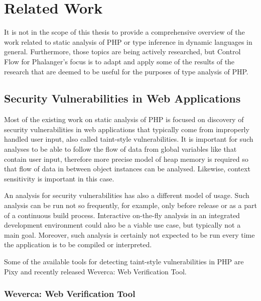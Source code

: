 \chapter{Related Work}

    It is not in the scope of this thesis to provide a comprehensive 
    overview of the work related to static analysis of PHP or type 
    inference in dynamic languages in general. Furthermore, those 
    topics are being actively researched, but Control Flow for 
    Phalanger's focus is to adapt and apply some of the results 
    of the research that are deemed to be useful for the 
    purposes of type analysis of PHP.

    \section{Security Vulnerabilities in Web Applications}
    
    Most of the existing work on static analysis of PHP is 
    focused on discovery of security vulnerabilities in 
    web applications that typically come from improperly 
    handled user input, also called taint-style vulnerabilities. 
    It is important for such analyses to be able to follow 
    the flow of data from global variables like  
    that contain user input, therefore more precise model of 
    heap memory is required so that flow of data in between 
    object instances can be analysed. Likewise, 
    context sensitivity is important in this case.
    
    An analysis for security vulnerabilities has also a different 
    model of usage. Such analysis can be run not so frequently, 
    for example, only before release or as a part of a continuous 
    build process. Interactive on-the-fly analysis in an 
    integrated development environment could also be a viable 
    use case, but typically not a main goal. Moreover, such analysis 
    is certainly not expected to be run every time the 
    application is to be compiled or interpreted.
    
    Some of the available tools for detecting taint-style 
    vulnerabilities in PHP are Pixy\cite{jovanovic2006pixy} and recently released 
    Weverca: Web Verification Tool\cite{hauzarhunting}.    
    
    \subsection{Weverca: Web Verification Tool}

